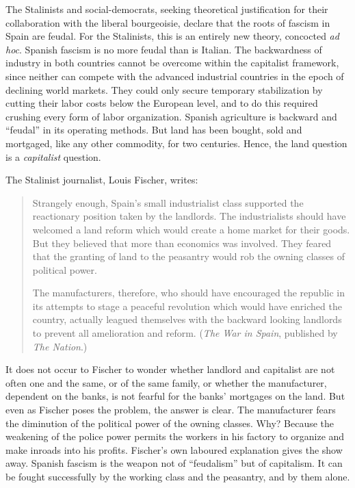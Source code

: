 The Stalinists and social-democrats, seeking theoretical justification for their collaboration with the liberal bourgeoisie, declare that the roots of fascism in Spain are feudal. For the Stalinists, this is an entirely new theory, concocted \emph{ad hoc}. Spanish fascism is no more feudal than is Italian. The backwardness of industry in both countries cannot be overcome within the capitalist framework, since neither can compete with the advanced industrial countries in the epoch of declining world markets. They could only secure temporary stabilization by cutting their labor costs below the European level, and to do this required crushing every form of labor organization. Spanish agriculture is backward and ``feudal'' in its operating methods. But land has been bought, sold and mortgaged, like any other commodity, for two centuries. Hence, the land question is a \emph{capitalist} question.
\noclub

The Stalinist journalist, Louis Fischer,{\indexLFischer} writes:

\begin{quotation}
  \sloppy
  
  Strangely enough, Spain’s small industrialist class supported the reactionary position taken by the landlords. The industrialists should have welcomed a land reform which would create a home market for their goods. But they believed that more than economics was involved. They feared that the granting of land to the peasantry would rob the owning classes of political power.
  
  The manufacturers, therefore, who should have encouraged the republic in its attempts to stage a peaceful revolution which would have enriched the country, actually leagued themselves with the backward looking landlords to prevent all amelioration and reform. (\emph{The War in Spain}, published by \emph{The Nation}.)
\end{quotation}

It does not occur to Fischer to wonder whether landlord and capitalist are not often one and the same, or of the same family, or whether the manufacturer, dependent on the banks, is not fearful for the banks’ mortgages on the land. But even as Fischer poses the problem, the answer is clear. The manufacturer fears the diminution of the political power of the owning classes. Why? Because the weakening of the police power permits the workers in his factory to organize and make inroads into his profits. Fischer’s own laboured explanation gives the show away. Spanish fascism is the weapon not of ``feudalism'' but of capitalism. It can be fought successfully by the working class and the peasantry, and by them alone.